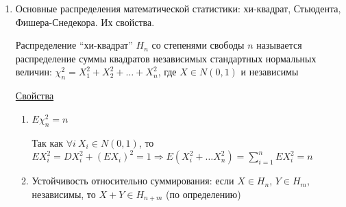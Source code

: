 \begin{enumerate}
    \Def Семейство распределений $F_\theta$ называется регулярным, если:

    \begin{itemize}
        \item существует носитель $C$ семейства $F_\theta$ такой, что $\forall x \in C \ $ функция $\ln f_\theta(x)$ непрерывно дифференцируема по $\theta$
        \item информация Фишера $I(\theta)$ существует и непрерывна по $\theta$
    \end{itemize}

    \begin{MyTheorem}
         Пусть $(X_1, \dots, X_n)$ -- выборка объема $n$ из регулярного семейства $F_\theta$,

        $\theta^* = \theta^*(X_1, \dots, X_n)$ -- несмещенная оценка параметра $\theta$, дисперсия которой
        $D\theta^*$ ограничена в любой замкнутой ограниченной области параметра $\theta$

        Тогда 
    \end{MyTheorem}

    \underline{Следствие}: если при данных условиях получили $D\theta^* = \frac{1}{n I(\theta)}$, то оценка $\theta^*$ является эффективной 
    (то есть дальше улучшать уже некуда)

    \item Основные распределения математической статистики: хи-квадрат, Стьюдента, Фишера-Снедекора. Их свойства.

    \Def Распределение \enquote{хи-квадрат} $H_n$ со степенями свободы $n$ называется распределение
    суммы квадратов независимых стандартных нормальных величин: $\chi^2_n = X_1^2 + X_2^2 + \dots + X_n^2$, 
    где $X \in N(0, 1)$ и независимы

    \underline{Свойства}

    \begin{enumerate}
        \item $E\chi^2_n = n$

        \begin{MyProof}
            Так как $\forall i \ X_i \in N(0, 1)$, то $E X_i^2 = D X_i^2 + (EX_i)^2 = 1 \Longrightarrow E(X_i^2 + \dots X_n^2) = \sum_{i = 1}^n E X_i^2 = n$
        \end{MyProof}

        \item Устойчивость относительно суммирования: если $X \in H_n$, $Y \in H_m$, независимы, то $X + Y \in H_{n + m}$ (по определению) 



\end{enumerate}
\end{enumerate}
